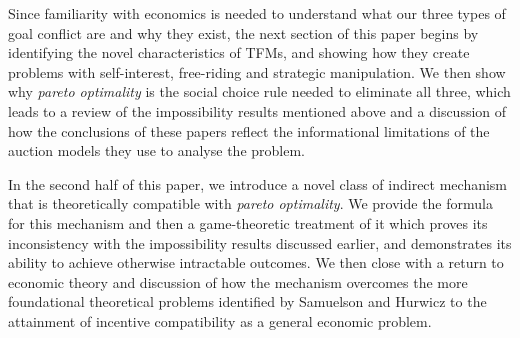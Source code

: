 Since familiarity with economics is needed to understand what our three types of goal conflict are and why they exist, the next section of this paper begins by identifying the novel characteristics of TFMs, and showing how they create problems with self-interest, free-riding and strategic manipulation. We then show why \textit{pareto optimality} is the social choice rule needed to eliminate all three, which leads to a review of the impossibility results mentioned above and a discussion of how the conclusions of these papers reflect the informational limitations of the auction models they use to analyse the problem.

In the second half of this paper, we introduce a novel class of indirect mechanism that is theoretically compatible with \textit{pareto optimality}. We provide the formula for this mechanism and then a game-theoretic treatment of it which proves its inconsistency with the impossibility results discussed earlier, and demonstrates its ability to achieve otherwise intractable outcomes. We then close with a return to economic theory and discussion of how the mechanism overcomes the more foundational theoretical problems identified by Samuelson and Hurwicz to the attainment of incentive compatibility as a general economic problem.

